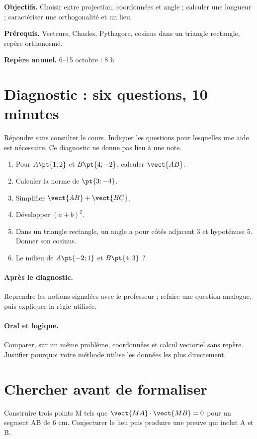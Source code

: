 \label{C03}
\begin{keypoint}
\textbf{Objectifs.} Choisir entre projection, coordonnées et angle ; calculer une longueur ; caractériser une orthogonalité et un lieu.

\textbf{Prérequis.} Vecteurs, Chasles, Pythagore, cosinus dans un triangle rectangle, repère orthonormé.

\textbf{Repère annuel.} 6–15 octobre : 8 h\end{keypoint}
\section*{Diagnostic : six questions, 10 minutes}\label{C03-D}
Répondre sans consulter le cours. Indiquer les questions pour lesquelles une aide est nécessaire. Ce diagnostic ne donne pas lieu à une note.
\begin{enumerate}
\item Pour $A\pt{1;2}$ et $B\pt{4;-2}$, calculer $\vect{AB}$.
\item Calculer la norme de $\pt{3;-4}$.
\item Simplifier $\vect{AB}+\vect{BC}$.
\item Développer $(a+b)^2$.
\item Dans un triangle rectangle, un angle a pour côtés adjacent 3 et hypoténuse 5. Donner son cosinus.
\item Le milieu de $A\pt{-2;1}$ et $B\pt{4;3}$ ?
\end{enumerate}
\paragraph{Après le diagnostic.} Reprendre les notions signalées avec le professeur ; refaire une question analogue, puis expliquer la règle utilisée.
\paragraph{Oral et logique.} Comparer, sur un même problème, coordonnées et calcul vectoriel sans repère. Justifier pourquoi votre méthode utilise les données les plus directement.
\mxnewpage
\section*{Chercher avant de formaliser}\label{C03-RECH}
Construire trois points M tels que $\vect{MA}\cdot\vect{MB}=0$ pour un segment AB de 6 cm. Conjecturer le lieu puis produire une preuve qui inclut A et B.
